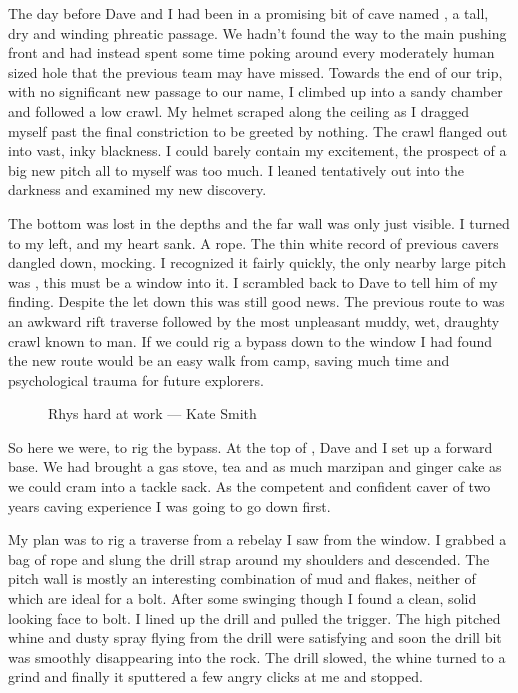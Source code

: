 The day before Dave and I had been in a promising bit of cave named , a tall, dry and winding phreatic passage. We hadn't found the way to the main pushing front and had instead spent some time poking around every moderately human sized hole that the previous team may have missed. Towards the end of our trip, with no significant new passage to our name, I climbed up into a sandy chamber and followed a low crawl. My helmet scraped along the ceiling as I dragged myself past the final constriction to be greeted by nothing. The crawl flanged out into vast, inky blackness. I could barely contain my excitement, the prospect of a big new pitch all to myself was too much. I leaned tentatively out into the darkness and examined my new discovery. 

The bottom was lost in the depths and the far wall was only just visible. I turned to my left, and my heart sank. A rope. The thin white record of previous cavers dangled down, mocking. I recognized it fairly quickly, the only nearby large pitch was , this must be a window into it. I scrambled back to Dave to tell him of my finding. Despite the let down this was still good news. The previous route to  was an awkward rift traverse followed by the most unpleasant muddy, wet, draughty crawl known to man. If we could rig a bypass down to the window I had found the new route would be an easy walk from camp, saving much time and psychological trauma for future explorers.



\begin{figure}[t!]
\label{}
\caption{Rhys hard at work --- Kate Smith}
\end{figure}

So here we were, to rig the bypass. At the top of , Dave and I set up a forward base. We had brought a gas stove, tea and as much marzipan and ginger cake as we could cram into a tackle sack. As the competent and confident caver of two years caving experience I was going to go down first. 

My plan was to rig a traverse from a rebelay I saw from the window. I grabbed a bag of rope and slung the drill strap around my shoulders and descended. The pitch wall is mostly an interesting combination of mud and flakes, neither of which are ideal for a bolt. After some swinging though I found a clean, solid looking face to bolt. I lined up the drill and pulled the trigger. The high pitched whine and dusty spray flying from the drill were satisfying and soon the drill bit was smoothly disappearing into the rock. The drill slowed, the whine turned to a grind and finally it sputtered a few angry clicks at me and stopped. 




